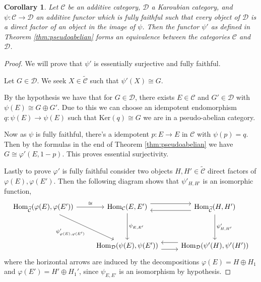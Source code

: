 \documentclass[12pt]{report}
\numberwithin{equation}{section}
\newcommand{\Hom}{{\mathrm{Hom}}}
\newtheorem{corollary}[dummy]{Corollary}
\begin{document}
	\begin{corollary}\label{thm:equivpseudoabelian}
		Let $\mathcal{C}$ be an additive category, $\mathcal{D}$ a Karoubian category, and $\psi: \mathcal{C} \to \mathcal{D}$ an additive functor which is fully faithful such that every object of $\mathcal{D}$ is a direct factor of an object in the image of $\psi$. Then the functor $\psi'$ as defined in Theorem \ref{thm:pseudoabelian} forms an equivalence between the categories $\mathcal{C}$ and $\mathcal{D}$.
	\end{corollary}
	\begin{proof}
		We will prove that $\psi'$ is essentially surjective and fully faithful. 
		
		Let $G \in \mathcal{D}$. We seek $X \in \widetilde{\mathcal{C}}$ such that $\psi'(X) \cong G$.
		
		By the hypothesis we have that for $G \in \mathcal{D}$, there exists $E \in \mathcal{C}$ and $G' \in \mathcal{D}$ with $\psi(E) \cong G \oplus G'$.
		Due to this we can choose an idempotent endomorphism $q: \psi(E) \to \psi(E)$ such that $\text{Ker}(q) \cong G$ we are in a pseudo-abelian category.
		
		Now as $\psi$ is fully faithful, there's a idempotent $p: E \to E$ in $\mathcal{C}$ with $\psi(p) = q$. Then by the formulas in the end of Theorem \ref{thm:pseudoabelian} we have $G \cong \varphi' (E,1-p).$ This proves essential surjectivity.
		
		Lastly to prove $\varphi'$ is fully faithful consider two objects $H, H' \in \widetilde{\mathcal{C}}$ direct factors of $\varphi(E), \varphi(E')$. Then the following diagram shows that $\psi'_{H,H'} $ is an isomorphic function,
		\[\begin{tikzcd}
			{\Hom_{\widetilde{\mathcal{C}}}( \varphi(E), \varphi(E'))} & {\Hom_{\mathcal{C} }(E,E')} & {\Hom_{\widetilde{\mathcal{C}}}(H,H')} \\
			\\
			& {\Hom_\mathcal{D} (\psi(E), \psi(E'))} & {\Hom_\mathcal{D}(\psi'(H), \psi'(H'))}
			\arrow["{\cong }", from=1-1, to=1-2]
			\arrow["{\psi'_{\varphi(E), \varphi(E')}}"', from=1-1, to=3-2]
			\arrow[shift left=2, from=1-2, to=1-3]
			\arrow["{\psi_{E,E'}}", from=1-2, to=3-2]
			\arrow[shift left=2, from=1-3, to=1-2]
			\arrow["{\psi'_{H,H'}}", from=1-3, to=3-3]
			\arrow[shift right=2, from=3-2, to=3-3]
			\arrow[shift right=2, from=3-3, to=3-2]
		\end{tikzcd}\]
		where the horizontal arrows are induced by the decompositions $\varphi(E)=H \oplus H_1$ and $\varphi(E')=H' \oplus H_1'$, since $\psi_{E,E'} $ is an isomorphism by hypothesis.
	\end{proof}
	
\end{document}
